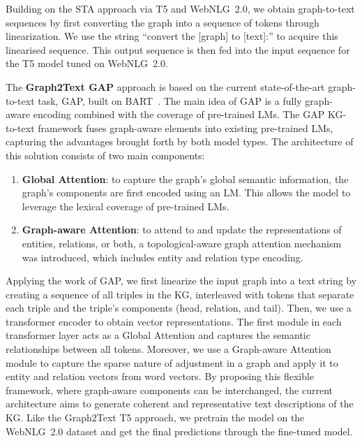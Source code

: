 Building on the STA approach via T5 and WebNLG~2.0, we obtain graph-to-text sequences by first converting the graph into a sequence of tokens through linearization. We use the string ``convert the [graph] to [text]:'' to acquire this linearised sequence. This output sequence is then fed into the input sequence for the T5 model tuned on WebNLG~2.0. 

The \textbf{Graph2Text GAP} approach is based on the current state-of-the-art graph-to-text task, GAP, built on BART~\cite{DBLP:conf/coling/ColasAW22-GAP}. 
The main idea of GAP is a fully graph-aware encoding combined with the coverage of pre-trained LMs. The GAP KG-to-text framework fuses graph-aware elements into existing pre-trained LMs, capturing the advantages brought forth by both model types. The architecture of this solution consists of two main components:

\begin{enumerate}
\item \textbf{Global Attention}: to capture the graph's global semantic information, the graph's components are first encoded using an LM. This allows the model to leverage the lexical coverage of pre-trained LMs.
\item \textbf{Graph-aware Attention}: to attend to and update the representations of entities, relations, or both, a topological-aware graph attention mechanism was introduced, which includes entity and relation type encoding.
\end{enumerate}

Applying the work of GAP, we first linearize the input graph into a text string by creating a sequence of all triples in the KG, interleaved with tokens that separate each triple and the triple's components (head, relation, and tail). Then, we use a transformer encoder to obtain vector representations. The first module in each transformer layer acts as a Global Attention and captures the semantic relationships between all tokens. Moreover, we use a Graph-aware Attention module to capture the sparse nature of adjustment in a graph and apply it to entity and relation vectors from word vectors. By proposing this flexible framework, where graph-aware components can be interchanged, the current architecture aims to generate coherent and representative text descriptions of the KG. Like the Graph2Text T5 approach, we pretrain the model on the WebNLG~2.0 dataset and get the final predictions through the fine-tuned model. 


